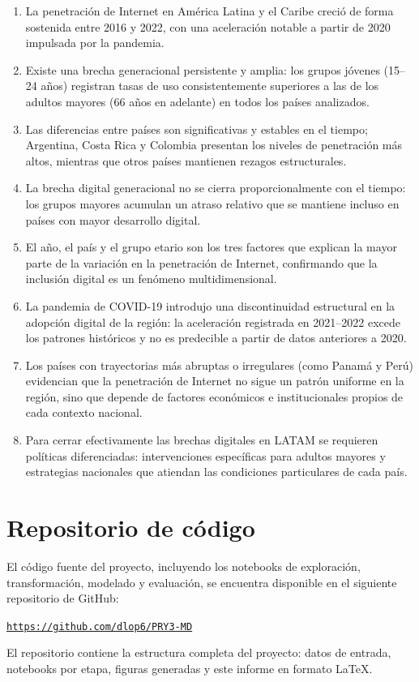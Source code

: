 \documentclass[12pt,a4paper]{article}
\begin{document}
\begin{enumerate}
    \item La penetraci\'on de Internet en Am\'erica Latina y el Caribe creci\'o de forma sostenida entre 2016 y 2022, con una aceleraci\'on notable a partir de 2020 impulsada por la pandemia.
    \item Existe una brecha generacional persistente y amplia: los grupos j\'ovenes (15--24 a\~nos) registran tasas de uso consistentemente superiores a las de los adultos mayores (66 a\~nos en adelante) en todos los pa\'ises analizados.
    \item Las diferencias entre pa\'ises son significativas y estables en el tiempo; Argentina, Costa Rica y Colombia presentan los niveles de penetraci\'on m\'as altos, mientras que otros pa\'ises mantienen rezagos estructurales.
    \item La brecha digital generacional no se cierra proporcionalmente con el tiempo: los grupos mayores acumulan un atraso relativo que se mantiene incluso en pa\'ises con mayor desarrollo digital.
    \item El a\~no, el pa\'is y el grupo etario son los tres factores que explican la mayor parte de la variaci\'on en la penetraci\'on de Internet, confirmando que la inclusi\'on digital es un fen\'omeno multidimensional.
    \item La pandemia de COVID-19 introdujo una discontinuidad estructural en la adopci\'on digital de la regi\'on: la aceleraci\'on registrada en 2021--2022 excede los patrones hist\'oricos y no es predecible a partir de datos anteriores a 2020.
    \item Los pa\'ises con trayectorias m\'as abruptas o irregulares (como Panam\'a y Per\'u) evidencian que la penetraci\'on de Internet no sigue un patr\'on uniforme en la regi\'on, sino que depende de factores econ\'omicos e institucionales propios de cada contexto nacional.
    \item Para cerrar efectivamente las brechas digitales en LATAM se requieren pol\'iticas diferenciadas: intervenciones espec\'ificas para adultos mayores y estrategias nacionales que atiendan las condiciones particulares de cada pa\'is.
\end{enumerate}

\appendix
\section{Repositorio de c\'odigo}

El c\'odigo fuente del proyecto, incluyendo los notebooks de exploraci\'on, transformaci\'on, modelado y evaluaci\'on, se encuentra disponible en el siguiente repositorio de GitHub:

\begin{center}
    \href{https://github.com/dlop6/PRY3-MD}{\texttt{https://github.com/dlop6/PRY3-MD}}
\end{center}

El repositorio contiene la estructura completa del proyecto: datos de entrada, notebooks por etapa, figuras generadas y este informe en formato \LaTeX.
\end{document}
